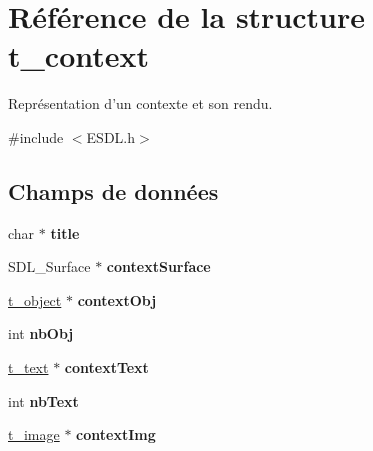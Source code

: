 \hypertarget{structt__context}{\section{Référence de la structure t\+\_\+context}
\label{structt__context}
}


Représentation d'un contexte et son rendu.  




{\ttfamily \#include $<$E\+S\+D\+L.\+h$>$}

\subsection*{Champs de données}
\begin{DoxyCompactItemize}
\item 
\hypertarget{structt__context_a4a7df9d5424430553daec47a2991517b}{char $\ast$ {\bfseries title}}\label{structt__context_a4a7df9d5424430553daec47a2991517b}

\item 
\hypertarget{structt__context_aca0248ead81de738da31f261b4fe10c1}{S\+D\+L\+\_\+\+Surface $\ast$ {\bfseries context\+Surface}}\label{structt__context_aca0248ead81de738da31f261b4fe10c1}

\item 
\hypertarget{structt__context_a745d5eeca52eb2a7c80f335a13e5a1b1}{\hyperlink{structt__object}{t\+\_\+object} $\ast$ {\bfseries context\+Obj}}\label{structt__context_a745d5eeca52eb2a7c80f335a13e5a1b1}

\item 
\hypertarget{structt__context_adb6138e42bff38bf7ba9bd12338e3461}{int {\bfseries nb\+Obj}}\label{structt__context_adb6138e42bff38bf7ba9bd12338e3461}

\item 
\hypertarget{structt__context_a0b2d2447880d622032230e7802a9d7e4}{\hyperlink{structt__text}{t\+\_\+text} $\ast$ {\bfseries context\+Text}}\label{structt__context_a0b2d2447880d622032230e7802a9d7e4}

\item 
\hypertarget{structt__context_a5db1966ec4e6d728c2adda05d32113ff}{int {\bfseries nb\+Text}}\label{structt__context_a5db1966ec4e6d728c2adda05d32113ff}

\item 
\hypertarget{structt__context_a40569f91fdd4d8482a8c0fa7e02d89e0}{\hyperlink{structt__image}{t\+\_\+image} $\ast$ {\bfseries context\+Img}}\label{structt__context_a40569f91fdd4d8482a8c0fa7e02d89e0}


\end{DoxyCompactItemize}
